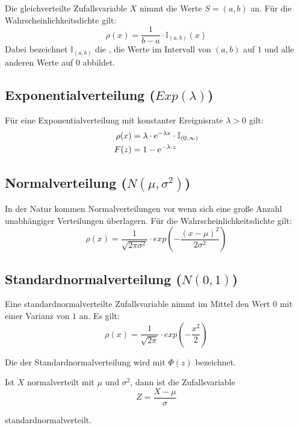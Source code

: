 Die gleichverteilte Zufallsvariable $X$ nimmt die Werte $S=(a,b)$ an. Für die
Wahrscheinlichkeitsdichte gilt:
\[
\rho(x) = \frac{1}{b-a}\cdot\mathbb{I}_{(a,b)}(x)
\]
Dabei bezeichnet $\mathbb{I}_{(a,b)}$ die , die Werte im
Intervall von $(a,b)$ auf $1$ und alle anderen Werte auf $0$ abbildet.

\subsection{Exponentialverteilung ($Exp(\lambda)$)}
\label{vert-exp}

Für eine Exponentialverteilung mit konstanter Ereignisrate $\lambda>0$ gilt:
\begin{align*}
\rho(x) &= \lambda\cdot \mathrm{e}^{-\lambda x}\cdot\mathbb{I}_{(0, \infty)} \\
F(z) &= 1 - \mathrm{e}^{-\lambda\cdot z}
\end{align*}

\subsection{Normalverteilung ($N(\mu, \sigma^2)$)}

In der Natur kommen Normalverteilungen vor wenn sich eine große Anzahl
unabhängiger Verteilungen überlagern. Für die Wahrscheinlichkeitsdichte gilt:
\[
\rho(x) = \frac{1}{\sqrt{2\pi\sigma^2}}\cdot exp(-\frac{(x-\mu)^2}{2\sigma^2})
\]

\subsection{Standardnormalverteilung ($N(0,1)$)}
\label{vert-stdnormal}

Eine standardnormalverteilte Zufallsvariable nimmt im Mittel den Wert $0$ mit
einer Varianz von $1$ an. Es gilt:
\[
\rho(x) = \frac{1}{\sqrt{2\pi}}\cdot exp(-\frac{x^2}{2})
\]

Die  der Standardnormalverteilung wird mit $\Phi(z)$ bezeichnet.

Ist $X$ normalverteilt mit $\mu$ und $\sigma^2$, dann ist die Zufallsvariable
\[
Z=\frac{X-\mu}{\sigma}
\]

standardnormalverteilt.

